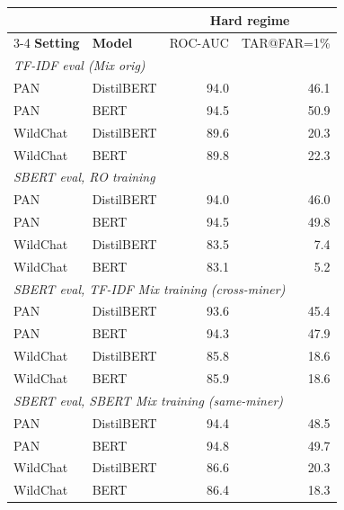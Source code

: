 \documentclass[11pt]{article}
\begin{document}
\begin{center}
\small
\begin{tabular}{l l rr}
\toprule
 & & \multicolumn{2}{c}{\textbf{Hard regime}} \\
 \cmidrule(lr){3-4}
\textbf{Setting} & \textbf{Model} & ROC-AUC & TAR@FAR=1\% \\
\midrule
\multicolumn{4}{l}{\textit{TF-IDF eval (Mix orig)}} \\
PAN      & DistilBERT  & 94.0 & 46.1 \\
PAN      & BERT        & 94.5 & 50.9 \\
WildChat & DistilBERT  & 89.6 & 20.3 \\
WildChat & BERT        & 89.8 & 22.3 \\
\midrule
\multicolumn{4}{l}{\textit{SBERT eval, RO training}} \\
PAN      & DistilBERT  & 94.0 & 46.0 \\
PAN      & BERT        & 94.5 & 49.8 \\
WildChat & DistilBERT  & 83.5 & \phantom{0}7.4 \\
WildChat & BERT        & 83.1 & \phantom{0}5.2 \\
\midrule
\multicolumn{4}{l}{\textit{SBERT eval, TF-IDF Mix training (cross-miner)}} \\
PAN      & DistilBERT  & 93.6 & 45.4 \\
PAN      & BERT        & 94.3 & 47.9 \\
WildChat & DistilBERT  & 85.8 & 18.6 \\
WildChat & BERT        & 85.9 & 18.6 \\
\midrule
\multicolumn{4}{l}{\textit{SBERT eval, SBERT Mix training (same-miner)}} \\
PAN      & DistilBERT  & 94.4 & 48.5 \\
PAN      & BERT        & 94.8 & 49.7 \\
WildChat & DistilBERT  & 86.6 & 20.3 \\
WildChat & BERT        & 86.4 & 18.3 \\
\bottomrule
\end{tabular}
\label{tab:sbert_ablation}
\end{center}
\end{document}
